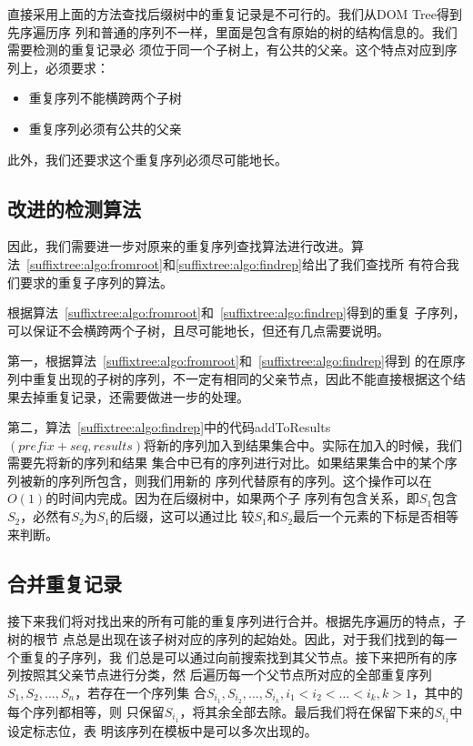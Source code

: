 直接采用上面的方法查找后缀树中的重复记录是不可行的。我们从DOM Tree得到先序遍历序
列和普通的序列不一样，里面是包含有原始的树的结构信息的。我们需要检测的重复记录必
须位于同一个子树上，有公共的父亲。这个特点对应到序列上，必须要求：
\begin{itemize}
\item 重复序列不能横跨两个子树
\item 重复序列必须有公共的父亲
\end{itemize}

此外，我们还要求这个重复序列必须尽可能地长。

\subsection{改进的检测算法}
因此，我们需要进一步对原来的重复序列查找算法进行改进。算
法~\ref{suffixtree:algo:fromroot}和\ref{suffixtree:algo:findrep}给出了我们查找所
有符合我们要求的重复子序列的算法。



根据算法~\ref{suffixtree:algo:fromroot}和~\ref{suffixtree:algo:findrep}得到的重复
子序列，可以保证不会横跨两个子树，且尽可能地长，但还有几点需要说明。

第一，根据算法~\ref{suffixtree:algo:fromroot}和~\ref{suffixtree:algo:findrep}得到
的在原序列中重复出现的子树的序列，不一定有相同的父亲节点，因此不能直接根据这个结
果去掉重复记录，还需要做进一步的处理。

第二，算法~\ref{suffixtree:algo:findrep}中的代码addToResults$(prefix + seq,
results)$将新的序列加入到结果集合中。实际在加入的时候，我们需要先将新的序列和结果
集合中已有的序列进行对比。如果结果集合中的某个序列被新的序列所包含，则我们用新的
序列代替原有的序列。这个操作可以在$O(1)$的时间内完成。因为在后缀树中，如果两个子
序列有包含关系，即$S_1$包含$S_2$，必然有$S_2$为$S_1$的后缀，这可以通过比
较$S_1$和$S_2$最后一个元素的下标是否相等来判断。

\subsection{合并重复记录}
接下来我们将对找出来的所有可能的重复序列进行合并。根据先序遍历的特点，子树的根节
点总是出现在该子树对应的序列的起始处。因此，对于我们找到的每一个重复的子序列，我
们总是可以通过向前搜索找到其父节点。接下来把所有的序列按照其父亲节点进行分类，然
后遍历每一个父节点所对应的全部重复序列$S_1,S_2,...,S_n$，若存在一个序列集
合${S_{i_1},S_{i_2},...,S_{i_k}}, i_1<i_2<...<i_k, k>1$，其中的每个序列都相等，则
只保留$S_{i_1}$，将其余全部去除。最后我们将在保留下来的$S_{i_1}$中设定标志位，表
明该序列在模板中是可以多次出现的。


